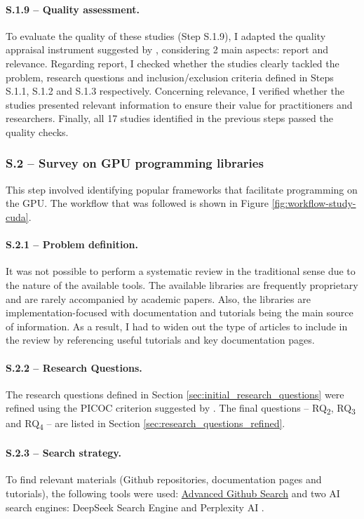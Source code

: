\paragraph{S.1.9 -- Quality assessment.}
To evaluate the quality of these studies (Step S.1.9), I adapted the quality appraisal instrument
suggested by \cite{zhou_map_2016}, considering 2 main aspects: report and relevance. Regarding
report, I checked whether the studies clearly tackled the problem, research questions and
inclusion/exclusion criteria defined in Steps S.1.1, S.1.2 and S.1.3 respectively. Concerning
relevance, I verified whether the studies presented relevant information to ensure their value for
practitioners and researchers. Finally, all 17 studies identified in the previous steps passed the
quality checks.

\subsubsection{S.2 -- Survey on GPU programming libraries}
\label{sec:gpu-programming-libraries}
This step involved identifying popular frameworks that facilitate programming on the GPU. The
workflow that was followed is shown in Figure \ref{fig:workflow-study-cuda}.

\paragraph{S.2.1 -- Problem definition.}
It was not possible to perform a systematic review in the traditional sense due to the nature of
the available tools. The available libraries are frequently proprietary and are rarely accompanied
by academic papers. Also, the libraries are implementation-focused with documentation and tutorials
being the main source of information. As a result, I had to widen out the type of articles to
include in the review by referencing useful tutorials and key documentation pages.

\paragraph{S.2.2 -- Research Questions.}
The research questions defined in Section \ref{sec:initial_research_questions} were refined using
the PICOC criterion suggested by \cite{keele_systematic_2007}. The final questions --
RQ\textsubscript{2}, RQ\textsubscript{3} and RQ\textsubscript{4} -- are listed in Section
\ref{sec:research_questions_refined}.

\paragraph{S.2.3 -- Search strategy.}
To find relevant materials (Github repositories, documentation pages and tutorials), the following
tools were used: \href{https://github.com/search/advanced}{Advanced Github Search} and two AI
search engines: DeepSeek Search Engine \cite{noauthor_deepseek_nodate} and Perplexity AI
\cite{noauthor_perplexity_nodate}.

